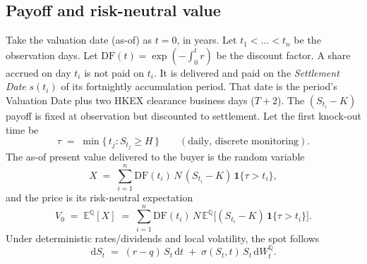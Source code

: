 \documentclass[11pt]{article}
\newcommand{\E}{\mathbb{E}}
\newcommand{\QQ}{\mathbb{Q}}
\newcommand{\dd}{\mathrm{d}}
\newcommand{\DF}{\mathrm{DF}}
\newcommand{\ind}[1]{\mathbf{1}\{#1\}}
\begin{document}
\subsection{Payoff and risk-neutral value}
Take the valuation date (as-of) as $t=0$, in years. Let $t_1<\dots<t_n$ be the observation days.
Let $\DF(t)=\exp(-\int_0^t r)$ be the discount factor. A share accrued on day $t_i$ is not paid on
$t_i$. It is delivered and paid on the \emph{Settlement Date} $s(t_i)$ of its fortnightly
accumulation period. That date is the period's Valuation Date plus two HKEX clearance business days
($T{+}2$). The $(S_{t_i}-K)$ payoff is fixed at observation but discounted to settlement. Let the first knock-out time be
\begin{equation}
  \tau \;=\; \min\bigl\{\, t_j : S_{t_j}\ge H \,\bigr\}
  \qquad(\text{daily, discrete monitoring}).
\end{equation}
The as-of present value delivered to the buyer is the random variable
\begin{equation}
  X \;=\; \sum_{i=1}^{n}\DF(t_i)\,N\,(S_{t_i}-K)\,\ind{\tau> t_i},
  \label{eq:payoff}
\end{equation}
and the price is its risk-neutral expectation
\begin{equation}
  V_0 \;=\; \E^{\QQ}[X]
      \;=\; \sum_{i=1}^{n}\DF(t_i)\,N\,\E^{\QQ}\!\bigl[(S_{t_i}-K)\,\ind{\tau> t_i}\bigr].
  \label{eq:price}
\end{equation}
Under deterministic rates/dividends and local volatility, the spot follows
\begin{equation}
  \dd S_t \;=\; (r-q)\,S_t\,\dd t \;+\; \sigma(S_t,t)\,S_t\,\dd W_t^{\QQ}.
  \label{eq:sde}
\end{equation}
\end{document}
